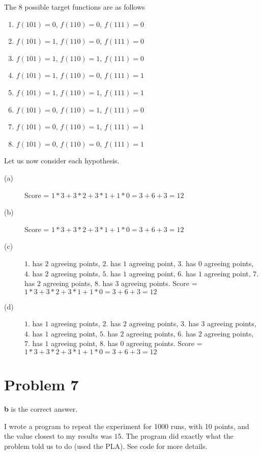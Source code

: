 \documentclass{article}
\begin{document}
\noindent The 8 possible target functions are as follows
\begin{enumerate}
    \item $f(101) = 0$, $f(110) = 0$, $f(111) = 0$
    \item $f(101) = 1$, $f(110) = 0$, $f(111) = 0$
    \item $f(101) = 1$, $f(110) = 1$, $f(111) = 0$
    \item $f(101) = 1$, $f(110) = 0$, $f(111) = 1$
    \item $f(101) = 1$, $f(110) = 1$, $f(111) = 1$
    \item $f(101) = 0$, $f(110) = 1$, $f(111) = 0$
    \item $f(101) = 0$, $f(110) = 1$, $f(111) = 1$
    \item $f(101) = 0$, $f(110) = 0$, $f(111) = 1$
\end{enumerate}
Let us now consider each hypothesis.
\begin{description}
    \item[(a)] Score = $1 * 3 + 3 * 2 + 3 * 1 + 1 * 0 = 3 + 6 + 3 = 12$
    \item[(b)] Score = $1 * 3 + 3 * 2 + 3 * 1 + 1 * 0 = 3 + 6 + 3 = 12$
    \item[(c)] $1.$ has $2$ agreeing points, $2.$ has $1$ agreeing point,
        $3.$ has $0$ agreeing points, $4.$ has $2$ agreeing points, $5.$ has
        $1$ agreeing point, $6.$ has $1$ agreeing point, $7.$ has $2$ agreeing
        points, $8.$ has $3$ agreeing points.
        Score = $1 * 3 + 3 * 2 + 3 * 1 + 1 * 0 = 3 + 6 + 3 = 12$
    \item[(d)] $1.$ has $1$ agreeing points, $2.$ has $2$ agreeing points,
        $3.$ has $3$ agreeing points, $4.$ has $1$ agreeing point, $5.$ has
        $2$ agreeing points, $6.$ has $2$ agreeing points, $7.$ has $1$ agreeing
        point, $8.$ has $0$ agreeing points.
        Score = $1 * 3 + 3 * 2 + 3 * 1 + 1 * 0 = 3 + 6 + 3 = 12$
\end{description}
\section*{Problem 7}
\textbf{b} is the correct answer.

\noindent I wrote a program to repeat the experiment for 1000 runs, with 10
points, and the value closest to my results was $15$. The program did exactly
what the problem told us to do (used the PLA).
See code for more details.
\end{document}
